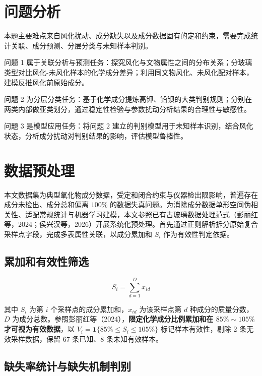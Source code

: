 \documentclass{ctexart}
\begin{document}
\section{问题分析}

本题主要难点来自风化扰动、成分缺失以及成分数据固有的定和约束，需要完成统计关联、成分预测、分层分类与未知样本判别。

问题 1 属于关联分析与预测任务：探究风化与文物属性之间的分布关系；分玻璃类型对比风化-未风化样本的化学成分差异；利用同文物风化、未风化配对样本，建模反推风化前原始成分。

问题 2 为分层分类任务：基于化学成分提炼高钾、铅钡的大类判别规则；分别在两类内部做亚类划分，通过稳定性检验与参数扰动分析结果的合理性与敏感性。

问题 3 是模型应用任务：将问题 2 建立的判别模型用于未知样本识别，结合风化状态，分析成分扰动对判别结果的影响，评估模型鲁棒性。

\section{数据预处理}

本文数据集为典型氧化物成分数据，受定和闭合约束与仪器检出限影响，普遍存在成分未检出、成分总和偏离 $100\%$ 的数据失真问题。为消除成分数据单形空间伪相关性、适配常规统计与机器学习建模，本文参照已有古玻璃数据处理范式（彭丽红等，2024；侯兴汉等，2026）\cite{penglihong2024,houxinghan2026}开展系统化预处理。首先通过正则解析拆分原始复合采样点字段，完成多表属性关联，以成分累加和 $S_i$ 作为有效性判定依据。

\subsection{累加和有效性筛选}

\begin{equation*}
S_{i}=\sum_{d=1}^{D}x_{id}
\end{equation*}

其中 $S_i$ 为第 $i$ 个采样点的成分累加和，$x_{id}$ 为该采样点第 $d$ 种成分的质量分数，$D$ 为成分总数。参照彭丽红等（2024），\textbf{限定化学成分比例累加和在 $85\%\sim105\%$ 才可视为有效数据}，以 $V_{i}=\mathbf{1}\{85\%\le S_{i}\le105\%\}$ 标记样本有效性，剔除 $2$ 条无效采样数据，保留 $67$ 条已知、$8$ 条未知有效样本。

\subsection{缺失率统计与缺失机制判别}
\end{document}
